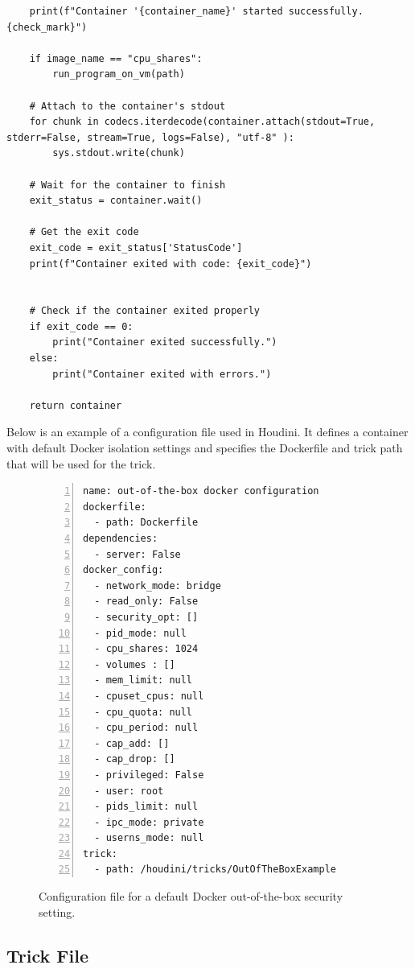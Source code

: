 \begin{doublespace}
\begin{lstlisting}
    print(f"Container '{container_name}' started successfully. {check_mark}")

    if image_name == "cpu_shares":
        run_program_on_vm(path)

    # Attach to the container's stdout
    for chunk in codecs.iterdecode(container.attach(stdout=True, stderr=False, stream=True, logs=False), "utf-8" ):
        sys.stdout.write(chunk)

    # Wait for the container to finish
    exit_status = container.wait()
    
    # Get the exit code
    exit_code = exit_status['StatusCode']
    print(f"Container exited with code: {exit_code}")
    

    # Check if the container exited properly
    if exit_code == 0:
        print("Container exited successfully.")
    else:
        print("Container exited with errors.")

    return container
\end{lstlisting}


Below is an example of a configuration file used in Houdini. It defines a container with default Docker isolation settings and specifies the Dockerfile and trick path that will be used for the trick.

\begin{figure}[H]
\caption{Configuration file for a default Docker out-of-the-box security setting.}
\label{fig:configuration-file}
\begin{lstlisting}[caption={}, numbers=left, numberstyle=\tiny, stepnumber=1, breaklines=true, frame=single, backgroundcolor=\color{gray!10}, basicstyle=\ttfamily\scriptsize, showspaces=false, showstringspaces=false]
name: out-of-the-box docker configuration
dockerfile:
  - path: Dockerfile
dependencies:
  - server: False
docker_config: 
  - network_mode: bridge
  - read_only: False
  - security_opt: []
  - pid_mode: null
  - cpu_shares: 1024
  - volumes : []
  - mem_limit: null
  - cpuset_cpus: null
  - cpu_quota: null
  - cpu_period: null
  - cap_add: []
  - cap_drop: []
  - privileged: False
  - user: root
  - pids_limit: null
  - ipc_mode: private
  - userns_mode: null
trick:
  - path: /houdini/tricks/OutOfTheBoxExample
\end{lstlisting}
\end{figure}




\subsection{Trick File}
\label{sec:trick_file}


\end{doublespace}
